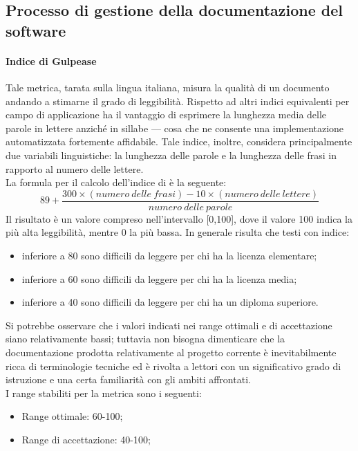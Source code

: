 			\subsection[Processo di gestione della documentazione del software]{\hypertarget{pgds}{Processo di gestione della documentazione del software}}
				
			\paragraph[Indice di Gulpease]{\hypertarget{ig}{Indice di Gulpease}}
			Tale metrica, tarata sulla lingua italiana, misura la qualità di un documento andando a stimarne il grado di leggibilità. Rispetto ad altri indici equivalenti per campo di applicazione ha il vantaggio di esprimere la lunghezza media delle parole in lettere anziché in sillabe --- cosa che ne consente una implementazione automatizzata fortemente affidabile. Tale indice, inoltre, considera principalmente due variabili linguistiche: la lunghezza delle parole e la lunghezza delle frasi in rapporto al numero delle lettere.
			\\La formula per il calcolo dell'indice di  è la seguente:
				\begin{equation}
					89+\frac{300\times(numero~delle~frasi)-10\times(numero~delle~lettere)}{numero~delle~parole}
				\end{equation}
			Il risultato è un valore compreso nell'intervallo [0,100], dove il valore 100 indica la più alta leggibilità, mentre 0 la più bassa. In generale risulta che testi con indice:
				\begin{itemize}
					\item inferiore a 80 sono difficili da leggere per chi ha la licenza elementare;
					\item inferiore a 60 sono difficili da leggere per chi ha la licenza media;
					\item inferiore a 40 sono difficili da leggere per chi ha un diploma superiore.	
				\end{itemize}
			Si potrebbe osservare che i valori indicati nei range ottimali e di accettazione siano relativamente bassi; tuttavia non bisogna dimenticare che la documentazione prodotta relativamente al progetto corrente è inevitabilmente ricca di terminologie tecniche ed è rivolta a lettori con un significativo grado di istruzione e una certa familiarità con gli ambiti affrontati.
			\\I range stabiliti per la metrica sono i seguenti:
				\begin{itemize}
					\item Range ottimale: 60-100;
					\item Range di accettazione: 40-100;
				\end{itemize}
				
